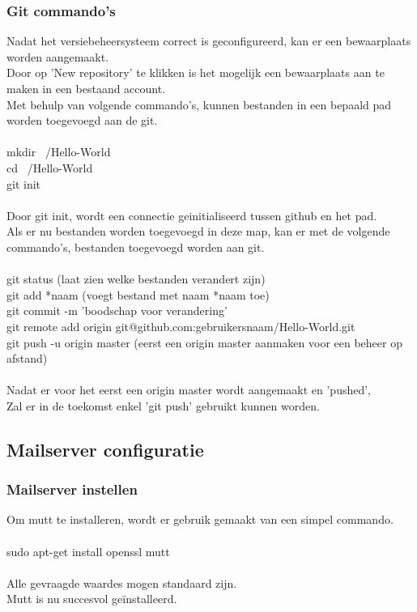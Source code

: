 \documentclass[12pt]{article}
\begin{document}
				\newpage
				\subsubsection{Git commando's}
					Nadat het versiebeheersysteem correct is geconfigureerd, kan er een bewaarplaats worden aangemaakt.\\
					Door op 'New repository' te klikken is het mogelijk een bewaarplaats aan te maken in een bestaand account.\\
					Met behulp van volgende commando's, kunnen bestanden in een bepaald pad worden toegevoegd aan de git.\\
					\\
					 mkdir ~/Hello-World\\
					 cd ~/Hello-World\\
					 git init\\
					 \\
					 Door git init, wordt een connectie geinitialiseerd tussen github en het pad.\\
					 Als er nu bestanden worden toegevoegd in deze map, kan er met de volgende commando's, bestanden toegevoegd worden aan git.\\
					 \\
					  git status (laat zien welke bestanden verandert zijn)\\
					  git add *naam (voegt bestand met naam *naam toe)\\
					  git commit -m 'boodschap voor verandering'\\
					  git remote add origin git@github.com:gebruikersnaam/Hello-World.git\\
					  git push -u origin master (eerst een origin master aanmaken voor een beheer op afstand)\\
					  \\
					  Nadat er voor het eerst een origin master wordt aangemaakt en 'pushed',\\
					  Zal er in de toekomst enkel 'git push' gebruikt kunnen worden.
			
			\newpage
			\subsection{Mailserver configuratie}\label{Mail}
				\subsubsection{Mailserver instellen}
					Om mutt te installeren, wordt er gebruik gemaakt van een simpel commando.\\
					\\					
					sudo apt-get install openssl mutt\\
					\\
					Alle gevraagde waardes mogen standaard zijn.\\
					Mutt is nu succesvol geïnstalleerd.
					
\end{document}
